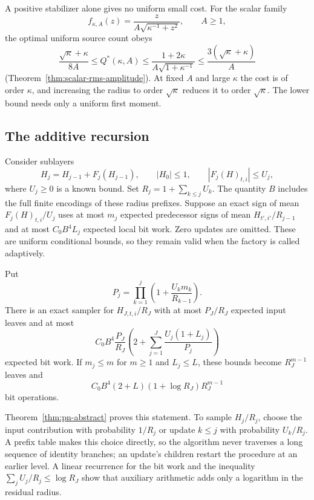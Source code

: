 A positive stabilizer alone gives no uniform small cost.
For the scalar family
\[
 f_{\kappa,A}(z)=\frac{z}{A\sqrt{\kappa^{-1}+z^2}},
 \qquad A\ge1,
\]
the optimal uniform source count obeys
\begin{equation}
 \frac{\sqrt\kappa+\kappa}{8A}
 \le Q^*(\kappa,A)
 \le \frac{1+2\kappa}{A\sqrt{1+\kappa^{-1}}}
 \le \frac{3(\sqrt\kappa+\kappa)}A
 \label{eq:main-scalar-rms-law}
\end{equation}
(Theorem~\ref{thm:scalar-rms-amplitude}). At fixed $A$ and large
$\kappa$ the cost is of order $\kappa$, and increasing the radius to
order $\sqrt\kappa$ reduces it to order $\sqrt\kappa$. The lower bound
needs only a uniform first moment.

\subsection{The additive recursion}

Consider sublayers
\[
 H_j=H_{j-1}+F_j(H_{j-1}),\qquad |H_0|\le1,
 \qquad |F_j(H)_{t,i}|\le U_j,
\]
where $U_j\ge0$ is a known bound. Set
$R_j=1+\sum_{k\le j}U_k$. The quantity $B$ includes the full
finite encodings of these radius prefixes.
Suppose an exact sign of mean $F_j(H)_{t,i}/U_j$ uses at most
$m_j$ expected predecessor signs of mean
$H_{t',i'}/R_{j-1}$ and at most $C_0B^4L_j$ expected local bit
work. Zero updates are omitted. These are uniform conditional
bounds, so they remain valid when the factory is called
adaptively.

\begin{theorem}
\label{thm:main-additive}
Put
\[
 P_j=\prod_{k=1}^j\left(1+\frac{U_km_k}{R_{k-1}}\right).
\]
There is an exact sampler for $H_{J,t,i}/R_J$ with at most
$P_J/R_J$ expected input leaves and at most
\begin{equation}
 C_0B^4\frac{P_J}{R_J}
 \left(2+\sum_{j=1}^J\frac{U_j(1+L_j)}{P_j}\right)
 \label{eq:main-additive-cost}
\end{equation}
expected bit work.
If $m_j\le m$ for $m\ge1$ and $L_j\le L$, these bounds become
$R_J^{m-1}$ leaves and
\[
 C_0B^4(2+L)(1+\log R_J)R_J^{m-1}
\]
bit operations.
\end{theorem}

Theorem~\ref{thm:pn-abstract} proves this statement.
To sample $H_j/R_j$, choose the input contribution with probability
$1/R_j$ or update $k\le j$ with probability $U_k/R_j$. A prefix table
makes this choice directly, so the algorithm never traverses a long
sequence of identity branches; an update's children restart the
procedure at an earlier level. A linear recurrence for the bit work
and the inequality $\sum_jU_j/R_j\le\log R_J$ show that auxiliary
arithmetic adds only a logarithm in the residual radius.

